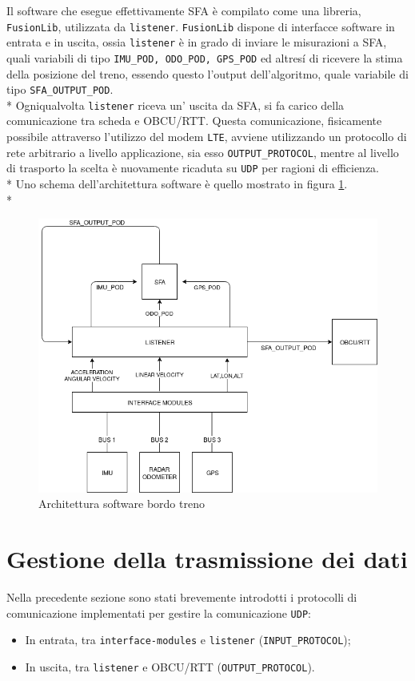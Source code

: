 Il software che esegue effettivamente SFA \`e compilato come una libreria, \texttt{FusionLib}, utilizzata da \texttt{listener}. \texttt{FusionLib} dispone di interfacce software in entrata e in uscita, ossia \texttt{listener} \`e in grado di inviare le misurazioni a SFA, quali variabili di tipo \texttt{IMU\_POD, ODO\_POD, GPS\_POD} ed altres\'i di ricevere la stima della posizione del treno, essendo questo l'output dell'algoritmo, quale variabile di tipo \texttt{SFA\_OUTPUT\_POD}.\\*
Ogniqualvolta \texttt{listener} riceva un' uscita da SFA, si fa carico della comunicazione tra scheda e OBCU/RTT. Questa comunicazione, fisicamente possibile attraverso l'utilizzo del modem \texttt{LTE}, avviene utilizzando un protocollo di rete arbitrario a livello applicazione, sia esso \texttt{OUTPUT\_PROTOCOL}, mentre al livello di trasporto la scelta \`e nuovamente ricaduta su \texttt{UDP} per ragioni di efficienza.\\*
Uno schema dell'architettura software \`e quello mostrato in figura \ref{fig:tdiagramint}.\\*
\begin{figure}[h]
	\centering
	\includegraphics[width=\linewidth]{img/InternalTrainSchema}
	\caption{Architettura software bordo treno}
	\label{fig:tdiagramint}
\end{figure}\newpage
\section{Gestione della trasmissione dei dati}
Nella precedente sezione sono stati brevemente introdotti i protocolli di comunicazione implementati per gestire la comunicazione \texttt{UDP}:
\begin{itemize}
	\item In entrata, tra \texttt{interface-modules} e \texttt{listener} (\texttt{INPUT\_PROTOCOL});
	\item In uscita, tra \texttt{listener} e OBCU/RTT (\texttt{OUTPUT\_PROTOCOL}).
\end{itemize}
